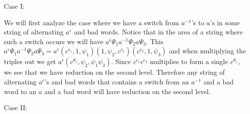 \documentclass[11pt]{amsart}
\theoremstyle{definition}
\theoremstyle{remark}
\numberwithin{equation}{section}
\begin{document}
Case I:

We will first analyze the case where we have a switch from $a^{-1}$'s to $a$'s in some string of alternating $a^{\epsilon}$ and bad words.  Notice that in the area of a string where such a switch occurs we will have $a^\epsilon\Psi_1a^{-1}\Psi_2a\Psi_3$. This $a^\epsilon\Psi_1a^{-1}\Psi_2a\Psi_3=a^\epsilon(c^{\epsilon_1},1,\psi_1)(1,\psi_2,c^{\epsilon_2})(c^{\epsilon_3},1,\psi_3)$ and when multiplying the triples out we get $a^\epsilon(c^{\theta_1},\psi_2,\psi_1\psi_3)$.  Since $c^{\epsilon_1}c^{\epsilon_3}$ multiplies to form a single $c^{\theta_1}$, we see that we have reduction on the second level.  Therefore any string of alternating $a^\epsilon$'s and bad words that contains a switch from an $a^{-1}$ and a bad word to an $a$ and a bad word will have reduction on the second level.

Case II:
\end{document}
